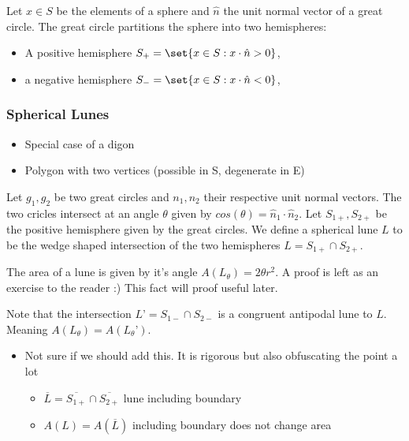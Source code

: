 Let \(x \in S\) be the elements of a sphere and \(\hat{n}\) the unit
normal vector of a great circle. The great circle partitions the sphere
into two hemispheres:

\begin{itemize}
\tightlist
\item
  A positive hemisphere \(S_+ = \set{x \in S: x \cdot \hat{n} > 0}\),
\item
  a negative hemisphere \(S_- = \set{x \in S: x \cdot \hat n < 0}\),
\end{itemize}

\subsubsection{Spherical Lunes}\label{spherical-lunes}

\begin{itemize}
\tightlist
\item[$\square$]
  Special case of a digon
\item[$\square$]
  Polygon with two vertices (possible in S, degenerate in E)
\end{itemize}

Let \(g_1, g_2\) be two great circles and \(n_1, n_2\) their respective
unit normal vectors. The two cricles intersect at an angle \(\theta\)
given by \(cos(\theta) = \hat n_1 \cdot \hat n_2\). Let
\(S_{1+}, S_{2+}\) be the positive hemisphere given by the great
circles. We define a spherical lune \(L\) to be the wedge shaped
intersection of the two hemispheres \(L = S_{1+} \cap S_{2+}\).

The area of a lune is given by it's angle \(A(L_\theta) = 2\theta r^2\).
A proof is left as an exercise to the reader :) This fact will proof
useful later.

Note that the intersection \(L’ = S_{1-} \cap S_{2-}\) is a congruent
antipodal lune to \(L\). Meaning \(A(L_\theta) = A(L_\theta’)\).

\begin{itemize}
\tightlist
\item[$\square$]
  Not sure if we should add this. It is rigorous but also obfuscating
  the point a lot

  \begin{itemize}
  \tightlist
  \item[$\square$]
    \(\overline{L} = \overline{S_{1+}} \cap \overline{S_{2+}}\) lune
    including boundary
  \item[$\square$]
    \(A(L) = A(\overline{L})\) including boundary does not change area
  \end{itemize}
\end{itemize}

